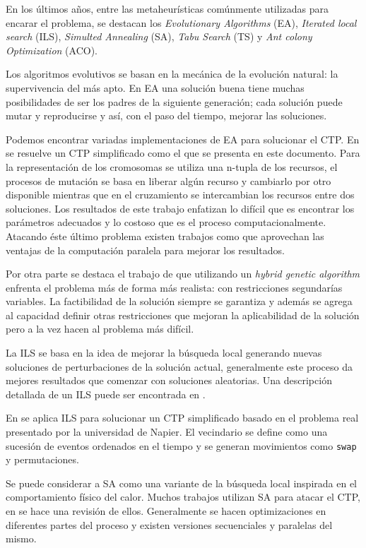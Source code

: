 \documentclass[letter, 10pt]{article}
\renewcommand{\tt}[1]{\texttt{#1}}
\begin{document}
En los últimos años, entre las metaheurísticas comúnmente utilizadas para
encarar el problema, se destacan los \emph{Evolutionary Algorithms} (EA),
\emph{Iterated local search} (ILS), \emph{Simulted Annealing} (SA),
\emph{Tabu Search} (TS) y \emph{Ant colony Optimization} (ACO).

Los algoritmos evolutivos se basan en la mecánica de la evolución natural: la
supervivencia del más apto. En EA una solución buena tiene muchas posibilidades
de ser los padres de la siguiente generación; cada solución puede mutar y
reproducirse y así, con el paso del tiempo, mejorar las soluciones.

Podemos encontrar variadas implementaciones de EA para solucionar el CTP. 
En \cite{erben1995genetic} se resuelve un CTP simplificado como el que se
presenta en este documento. Para la representación de los cromosomas se utiliza
una n-tupla de los recursos, el procesos de mutación se basa en liberar algún
recurso y cambiarlo por otro disponible mientras que en el cruzamiento se
intercambian los recursos entre dos soluciones. Los resultados de este trabajo
enfatizan lo difícil que es encontrar los parámetros adecuados y lo costoso que
es el proceso computacionalmente. Atacando éste último problema existen trabajos
como \cite{abramson1991parallel} que aprovechan las ventajas de la computación
paralela para mejorar los resultados.

Por otra parte se destaca el trabajo de \cite{weare1995hybrid} que utilizando un
\emph{hybrid genetic algorithm} enfrenta el problema más de forma más realista: 
con restricciones segundarías variables. La factibilidad de la solución siempre
se garantiza y además se agrega al capacidad definir otras restricciones que
mejoran la aplicabilidad de la solución pero a la vez hacen al problema más
difícil.

La ILS se basa en la idea de mejorar la búsqueda local generando nuevas
soluciones de perturbaciones de la solución actual, generalmente este proceso da
mejores resultados que comenzar con soluciones aleatorias. Una descripción
detallada de un ILS puede ser encontrada en \cite{stutzle1998local}.

En \cite{rossi2002local} se aplica ILS para solucionar un CTP simplificado
basado en el problema real presentado por la universidad de Napier. El
vecindario se define como una sucesión de eventos ordenados en el tiempo y se
generan movimientos como \tt{swap} y permutaciones.

Se puede considerar a SA como una variante de la búsqueda local inspirada en el
comportamiento físico del calor. Muchos trabajos utilizan SA para atacar el CTP,
en \cite{thompson1996variants} se hace una revisión de ellos. Generalmente se
hacen optimizaciones en diferentes partes del proceso y existen versiones
secuenciales y paralelas del mismo.
\end{document}
